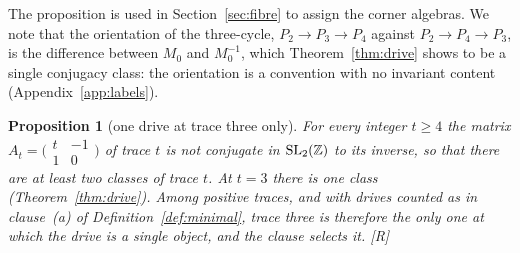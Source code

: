 \documentclass[11pt,a4paper]{article}
\theoremstyle{plain}
\newtheorem{proposition}[theorem]{Proposition}
\theoremstyle{definition}
\theoremstyle{remark}
\newcommand{\rigR}{[\textup{R}]}
\begin{document}
The proposition is used in Section~\ref{sec:fibre} to assign the corner algebras. We note that the orientation of the three-cycle, $P_{2}\to P_{3}\to P_{4}$ against $P_{2}\to P_{4}\to P_{3}$, is the difference between $M_{0}$ and $M_{0}^{-1}$, which Theorem~\ref{thm:drive} shows to be a single conjugacy class: the orientation is a convention with no invariant content (Appendix~\ref{app:labels}).

\begin{proposition}[one drive at trace three only]\label{prop:onedrive}
For every integer $t\geq4$ the matrix $A_{t}=\bigl(\begin{smallmatrix}t&-1\\1&0\end{smallmatrix}\bigr)$ of trace $t$ is not conjugate in $\mathrm{SL}_{2}(\mathbb{Z})$ to its inverse, so that there are at least two classes of trace $t$. At $t=3$ there is one class (Theorem~\ref{thm:drive}). Among positive traces, and with drives counted as in clause~(a) of Definition~\ref{def:minimal}, trace three is therefore the only one at which the drive is a single object, and the clause selects it. \rigR
\end{proposition}
\end{document}
